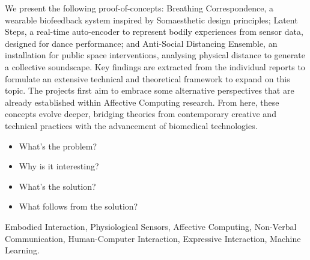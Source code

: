 We present the following proof-of-concepts: Breathing Correspondence, a wearable biofeedback system inspired by Somaesthetic design principles; Latent Steps, a real-time auto-encoder to represent bodily experiences from sensor data, designed for dance performance; and Anti-Social Distancing Ensemble, an installation for public space interventions, analysing physical distance to generate a collective soundscape. Key findings are extracted from the individual reports to formulate an extensive technical and theoretical framework to expand on this topic. The projects first aim to embrace some alternative perspectives that are already established within Affective Computing research. From here, these concepts evolve deeper, bridging theories from contemporary creative and technical practices with the advancement of biomedical technologies.


\begin{itemize}
	\item What's the problem?
	\item Why is it interesting?
	\item What's the solution?
	\item What follows from the solution?
\end{itemize}

\begin{keywords}
Embodied Interaction, Physiological Sensors, Affective Computing, Non-Verbal Communication, Human-Computer Interaction, Expressive Interaction, Machine Learning.
\end{keywords} 
